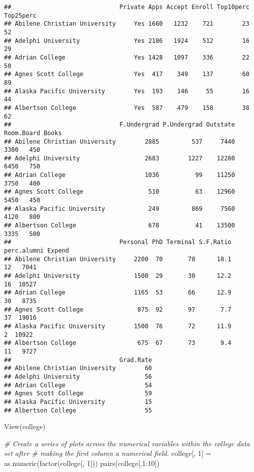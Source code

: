 \documentclass[
]{article}
\newenvironment{Shaded}{\begin{snugshade}}{\end{snugshade}}
\newcommand{\CommentTok}[1]{\textcolor[rgb]{0.56,0.35,0.01}{\textit{#1}}}
\newcommand{\DecValTok}[1]{\textcolor[rgb]{0.00,0.00,0.81}{#1}}
\newcommand{\FunctionTok}[1]{\textcolor[rgb]{0.00,0.00,0.00}{#1}}
\newcommand{\NormalTok}[1]{#1}
\newcommand{\OtherTok}[1]{\textcolor[rgb]{0.56,0.35,0.01}{#1}}
\newcommand{\SpecialCharTok}[1]{\textcolor[rgb]{0.00,0.00,0.00}{#1}}
\begin{document}
\begin{verbatim}
##                              Private Apps Accept Enroll Top10perc Top25perc
## Abilene Christian University     Yes 1660   1232    721        23        52
## Adelphi University               Yes 2186   1924    512        16        29
## Adrian College                   Yes 1428   1097    336        22        50
## Agnes Scott College              Yes  417    349    137        60        89
## Alaska Pacific University        Yes  193    146     55        16        44
## Albertson College                Yes  587    479    158        38        62
##                              F.Undergrad P.Undergrad Outstate Room.Board Books
## Abilene Christian University        2885         537     7440       3300   450
## Adelphi University                  2683        1227    12280       6450   750
## Adrian College                      1036          99    11250       3750   400
## Agnes Scott College                  510          63    12960       5450   450
## Alaska Pacific University            249         869     7560       4120   800
## Albertson College                    678          41    13500       3335   500
##                              Personal PhD Terminal S.F.Ratio perc.alumni Expend
## Abilene Christian University     2200  70       78      18.1          12   7041
## Adelphi University               1500  29       30      12.2          16  10527
## Adrian College                   1165  53       66      12.9          30   8735
## Agnes Scott College               875  92       97       7.7          37  19016
## Alaska Pacific University        1500  76       72      11.9           2  10922
## Albertson College                 675  67       73       9.4          11   9727
##                              Grad.Rate
## Abilene Christian University        60
## Adelphi University                  56
## Adrian College                      54
## Agnes Scott College                 59
## Alaska Pacific University           15
## Albertson College                   55
\end{verbatim}

\begin{Shaded}
\begin{Highlighting}[]
\FunctionTok{View}\NormalTok{(college)}

\CommentTok{\# Create a series of plots across the numerical variables within the college data set after}
\CommentTok{\# making the first column a numerical field.}
\NormalTok{college[, }\DecValTok{1}\NormalTok{] }\OtherTok{=} \FunctionTok{as.numeric}\NormalTok{(}\FunctionTok{factor}\NormalTok{(college[, }\DecValTok{1}\NormalTok{]))}
\FunctionTok{pairs}\NormalTok{(college[,}\DecValTok{1}\SpecialCharTok{:}\DecValTok{10}\NormalTok{])}
\end{Highlighting}
\end{Shaded}
\end{document}

